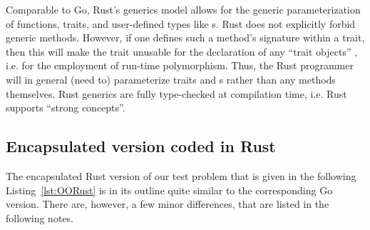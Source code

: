 \documentclass[11pt,oneside]{report}
\newcommand{\code}[1]{{\selectfont\ttfamily{#1}}}
\begin{document}
Comparable to Go, Rust's generics model allows for the generic
parameterization of functions, traits, and user-defined types like
\code{struct}s. Rust does not explicitly forbid generic
methods. However, if one defines such a method's signature within a
trait, then this will make the trait unusable for the declaration of
any ``trait objects'' \cite{Lyon}, i.e. for the employment of run-time
polymorphism. Thus, the Rust programmer will in general (need to)
parameterize traits and \code{struct}s rather than any methods
themselves. Rust generics are fully type-checked at compilation time,
i.e. Rust supports ``strong concepts''.

\subsection{Encapsulated version coded in Rust}

The encapsulated Rust version of our test problem that is given in the
following Listing~\ref{lst:OORust} is in its outline quite similar to
the corresponding Go version. There are, however, a few minor
differences, that are listed in the following notes.
\end{document}
